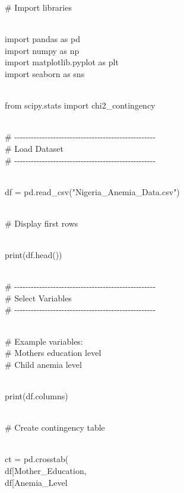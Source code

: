 \documentclass[
]{article}
\begin{document}
\# Import libraries\\
\strut \\
import pandas as pd\\
import numpy as np\\
import matplotlib.pyplot as plt\\
import seaborn as sns\\
\strut \\
from scipy.stats import chi2\_contingency\\
\strut \\
\#
-\/-\/-\/-\/-\/-\/-\/-\/-\/-\/-\/-\/-\/-\/-\/-\/-\/-\/-\/-\/-\/-\/-\/-\/-\/-\/-\/-\/-\/-\/-\/-\/-\/-\/-\/-\/-\/-\/-\/-\/-\/-\/-\/-\/-\/-\/-\/-\/-\/-\/-\\
\# Load Dataset\\
\#
-\/-\/-\/-\/-\/-\/-\/-\/-\/-\/-\/-\/-\/-\/-\/-\/-\/-\/-\/-\/-\/-\/-\/-\/-\/-\/-\/-\/-\/-\/-\/-\/-\/-\/-\/-\/-\/-\/-\/-\/-\/-\/-\/-\/-\/-\/-\/-\/-\/-\/-\\
\strut \\
df = pd.read\_csv("Nigeria\_Anemia\_Data.csv")\\
\strut \\
\# Display first rows\\
\strut \\
print(df.head())\\
\strut \\
\#
-\/-\/-\/-\/-\/-\/-\/-\/-\/-\/-\/-\/-\/-\/-\/-\/-\/-\/-\/-\/-\/-\/-\/-\/-\/-\/-\/-\/-\/-\/-\/-\/-\/-\/-\/-\/-\/-\/-\/-\/-\/-\/-\/-\/-\/-\/-\/-\/-\/-\/-\\
\# Select Variables\\
\#
-\/-\/-\/-\/-\/-\/-\/-\/-\/-\/-\/-\/-\/-\/-\/-\/-\/-\/-\/-\/-\/-\/-\/-\/-\/-\/-\/-\/-\/-\/-\/-\/-\/-\/-\/-\/-\/-\/-\/-\/-\/-\/-\/-\/-\/-\/-\/-\/-\/-\/-\\
\strut \\
\# Example variables:\\
\# Mother\textquotesingle s education level\\
\# Child anemia level\\
\strut \\
print(df.columns)\\
\strut \\
\# Create contingency table\\
\strut \\
ct = pd.crosstab(\\
df{[}\textquotesingle Mother\_Education\textquotesingle{]},\\
df{[}\textquotesingle Anemia\_Level\textquotesingle{]}\\
\end{document}
